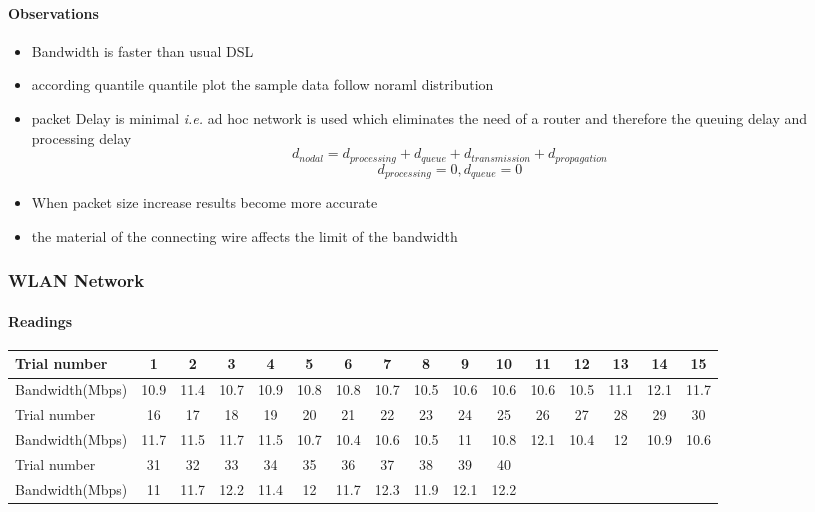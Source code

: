 \documentclass[aps,letterpaper,10pt]{revtex4}
\begin{document}
            \paragraph{Observations}
                \begin{itemize}
                        \item Bandwidth is faster than usual DSL 
                        \item according quantile quantile plot the sample data follow noraml distribution
                        \item packet Delay is minimal \textit{i.e.} ad hoc network is used which eliminates the need of a router and therefore the queuing delay and processing delay \\
                        \[
                        d_{nodal} = d_{processing} + d_{queue} + d_{transmission} + d_{propagation}
                        \] 
                        \[
                        d_{processing} = 0 , d_{queue} = 0
                        \] 
                        \item When packet size increase results become more accurate
                        \item the material of the connecting wire affects the limit of the bandwidth
                    \end{itemize}
        \newpage            
        \subsubsection{WLAN Network}
            \paragraph{Readings}
                \begin{center}
                    \begin{tabular}{ ||l || c | c | c | c | c | c | c | c | c | c | c | c | c | c | c | }
                    \hline
                    Trial number & 1 & 2 & 3 & 4 & 5 & 6 & 7 & 8 & 9 & 10 & 11 & 12 & 13 & 14 & 15 \\ \hline
                    Bandwidth(Mbps) & 10.9 & 11.4 & 10.7 & 10.9 & 10.8 & 10.8 & 10.7 & 10.5 & 10.6 & 10.6 & 10.6 & 10.5 & 11.1 & 12.1 & 11.7 \\
                    \hline   
                    \hline
                    Trial number & 16 & 17 & 18 & 19 & 20 & 21 & 22 & 23 & 24 & 25 & 26 & 27 & 28 & 29 & 30 \\ \hline 
                    Bandwidth(Mbps) & 11.7 & 11.5 & 11.7 & 11.5 & 10.7 & 10.4 & 10.6 & 10.5 & 11 & 10.8 & 12.1 & 10.4 & 12 & 10.9 & 10.6 \\ \hline    
                    \hline
                    Trial number & 31 & 32 & 33 & 34 & 35 & 36 & 37 & 38 & 39 & 40 & & & & & \\ \hline
                    Bandwidth(Mbps) & 11 & 11.7 & 12.2 & 11.4 & 12 & 11.7 & 12.3 & 11.9 & 12.1 & 12.2 & & & & &\\
                    \hline
                    \end{tabular}
                \end{center}
                \vspace{3mm}
\end{document}
